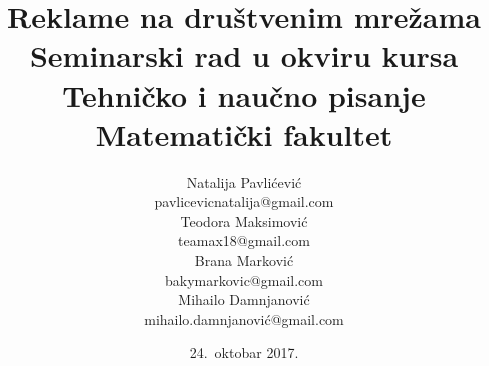\documentclass[a4paper]{article}
\begin{document}
	\title{Reklame na društvenim mrežama\\ \small{Seminarski rad u okviru kursa\\Tehničko i naučno pisanje\\ Matematički fakultet}}
	
	\author{Natalija Pavlićević\\ pavlicevicnatalija@gmail.com\\ Teodora Maksimović\\ teamax18@gmail.com\\ Brana Marković\\ bakymarkovic@gmail.com\\ Mihailo Damnjanović\\ mihailo.damnjanović@gmail.com}
	\date{24.~oktobar 2017.}
	
	\abstract{
	}

\newpage
	
	
\end{document}
